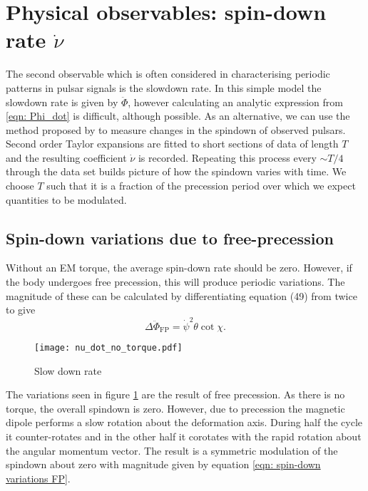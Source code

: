 \documentclass[/home/greg/Thesis/main/main.tex]{subfiles}
\begin{document}
\graphicspath{{/home/greg/Neutron_star_modelling/SpindownRate/img/}}

\section{Physical observables: spin-down rate $\dot{\nu}$}

The second observable which is often considered in characterising periodic
patterns in pulsar signals is the slowdown rate. In this simple model the
slowdown rate is given by $\ddot{\Phi}$, however calculating an analytic
expression from \eqref{eqn: Phi_dot} is difficult, although possible. As an alternative, we
can use the method proposed by \citet{Lyne2010} to measure changes in the
spindown of observed pulsars. Second order Taylor expansions are fitted to
short sections of data of length $T$ and the resulting coefficient $\dot{\nu}$
is recorded. Repeating this process every $\sim T/4$ through the data set
builds picture of how the spindown varies with time. We choose $T$ such that it
is a fraction of the precession period over which we expect quantities to be
modulated.

\subsection{Spin-down variations due to free-precession}
Without an EM torque, the average spin-down rate should be zero. However, if
the body undergoes free precession, this will produce periodic variations. The
magnitude of these can be calculated by differentiating equation (49) from 
\citet{Jones2001} twice to give
\begin{equation}
    \Delta\ddot{\Phi}_{\mathrm{FP}} =\dot{\psi}^{2} \theta \cot\chi. 
    \label{eqn: spin-down variations FP}
\end{equation}


\begin{figure}[ht]
\centering
	\texttt{[image: nu\_dot\_no\_torque.pdf]}
\caption{Slow down rate }
\label{fig: nu_dot no torque}
\end{figure}

The variations seen in figure \ref{fig: nu_dot no torque} are the result of
free precession. As there is no torque, the overall spindown is zero. However,
due to precession the magnetic dipole performs a slow rotation about the
deformation axis. During half the cycle it counter-rotates and in the other
half it corotates with the rapid rotation about the angular momentum vector.
The result is a symmetric modulation of the spindown about zero with magnitude
given by equation \eqref{eqn: spin-down variations FP}.
\end{document}
